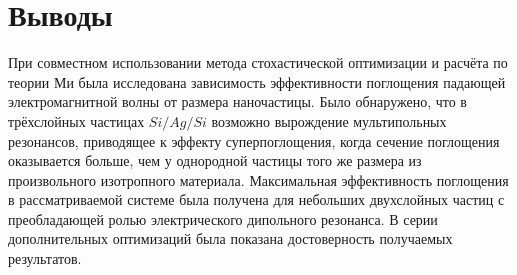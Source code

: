 \section{Выводы}

При совместном использовании метода стохастической оптимизации и
расчёта по теории Ми была исследована зависимость эффективности
поглощения падающей электромагнитной волны от размера
наночастицы. Было обнаружено, что в трёхслойных частицах $Si/Ag/Si$
возможно вырождение мультипольных резонансов, приводящее к эффекту
суперпоглощения, когда сечение поглощения оказывается больше, чем у
однородной частицы того же размера из произвольного изотропного
материала. Максимальная эффективность поглощения в рассматриваемой
системе была получена для небольших двухслойных частиц с преобладающей
ролью электрического дипольного резонанса. В серии дополнительных
оптимизаций была показана достоверность получаемых результатов.

\clearpage